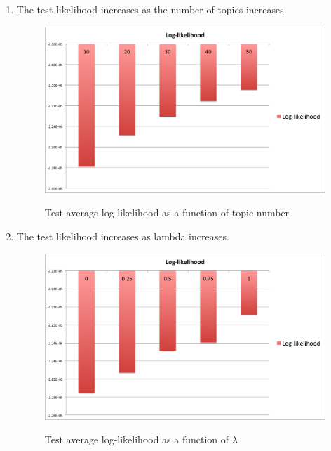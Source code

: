 \documentclass[12pt, letterpaper]{article}
\begin{document}
\begin{enumerate}[1.]
   \item 
       The test likelihood increases as the number of topics increases.

        \begin{figure}[ht]
            \caption{Test average log-likelihood as a function of topic number}
            \includegraphics[scale=0.5]{ml_graph_4}\\
        \end{figure}

   \item
       The test likelihood increases as lambda increases.

        \begin{figure}[ht]
            \caption{Test average log-likelihood as a function of $\lambda$}
            \includegraphics[scale=0.5]{ml_graph_5}\\
        \end{figure}


\end{enumerate}
\end{document}
